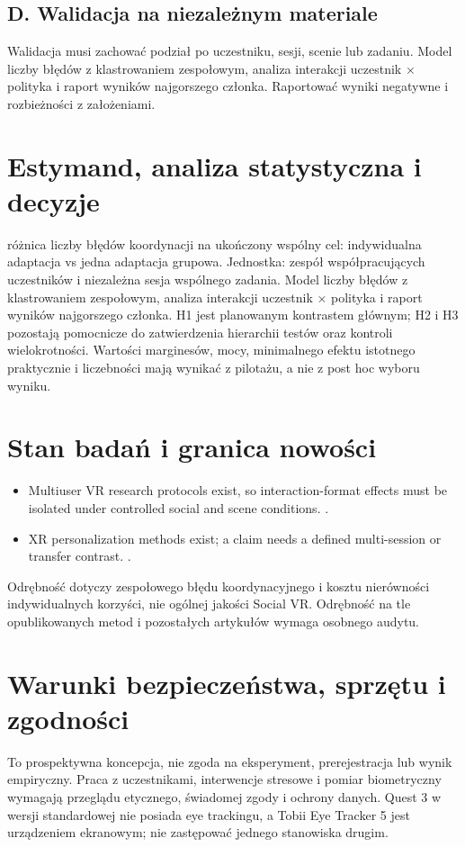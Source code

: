 \documentclass[11pt,a4paper]{article}
\begin{document}
\subsection{D. Walidacja na niezależnym materiale}
Walidacja musi zachować podział po uczestniku, sesji, scenie lub zadaniu. Model liczby błędów z klastrowaniem zespołowym, analiza interakcji uczestnik × polityka i raport wyników najgorszego członka. Raportować wyniki negatywne i rozbieżności z założeniami.
\section{Estymand, analiza statystyczna i decyzje}
różnica liczby błędów koordynacji na ukończony wspólny cel: indywidualna adaptacja vs jedna adaptacja grupowa. Jednostka: zespół współpracujących uczestników i niezależna sesja wspólnego zadania. Model liczby błędów z klastrowaniem zespołowym, analiza interakcji uczestnik × polityka i raport wyników najgorszego członka. H1 jest planowanym kontrastem głównym; H2 i H3 pozostają pomocnicze do zatwierdzenia hierarchii testów oraz kontroli wielokrotności. Wartości marginesów, mocy, minimalnego efektu istotnego praktycznie i liczebności mają wynikać z pilotażu, a nie z post hoc wyboru wyniku.
\section{Stan badań i granica nowości}
\begin{itemize}
\item Multiuser VR research protocols exist, so interaction-format effects must be isolated under controlled social and scene conditions. \cite{xrprior1}.
\item XR personalization methods exist; a claim needs a defined multi-session or transfer contrast. \cite{xrprior2}.
\end{itemize}
Odrębność dotyczy zespołowego błędu koordynacyjnego i kosztu nierówności indywidualnych korzyści, nie ogólnej jakości Social VR. Odrębność na tle opublikowanych metod i pozostałych artykułów wymaga osobnego audytu.
\section{Warunki bezpieczeństwa, sprzętu i zgodności}
To prospektywna koncepcja, nie zgoda na eksperyment, prerejestracja lub wynik empiryczny. Praca z uczestnikami, interwencje stresowe i pomiar biometryczny wymagają przeglądu etycznego, świadomej zgody i ochrony danych. Quest 3 w wersji standardowej nie posiada eye trackingu, a Tobii Eye Tracker 5 jest urządzeniem ekranowym; nie zastępować jednego stanowiska drugim.
\end{document}
